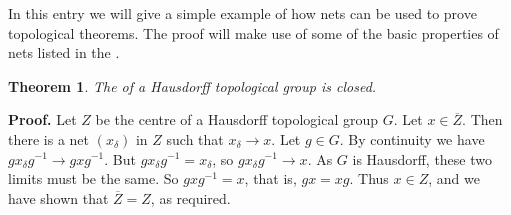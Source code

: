 \documentclass[12pt]{article}
\newtheorem*{thm*}{Theorem}
\def\closure{\overline}
\begin{document}

In this entry we will give a simple example
of how nets can be used to prove topological theorems.
The proof will make use of some of the basic properties of nets
listed in the .

\begin{thm*}
The  of a Hausdorff topological group is closed.
\end{thm*}

{\bf Proof.}
Let $Z$ be the centre of a Hausdorff topological group $G$.
Let $x\in\closure{Z}$.
Then there is a net $(x_\delta)$ in $Z$ such that $x_\delta\to x$.
Let $g\in G$.
By continuity we have $gx_\delta g^{-1}\to gxg^{-1}$.
But $gx_\delta g^{-1}=x_\delta$, so $gx_\delta g^{-1}\to x$.
As $G$ is Hausdorff, these two limits must be the same.
So $gxg^{-1}=x$, that is, $gx=xg$.
Thus $x\in Z$,
and we have shown that $\closure{Z}=Z$, as required.

\end{document}
